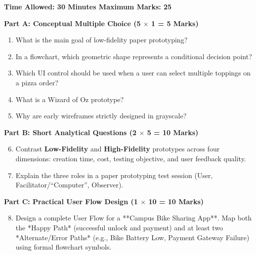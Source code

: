 \begin{chaptertest}
\textbf{Time Allowed: 30 Minutes \hfill Maximum Marks: 25}

\vspace{0.4cm}
\noindent\textbf{Part A: Conceptual Multiple Choice (5 $\times$ 1 = 5 Marks)}
\begin{enumerate}[leftmargin=1.2em, itemsep=2pt]
    \item What is the main goal of low-fidelity paper prototyping?
    \item In a flowchart, which geometric shape represents a conditional decision point?
    \item Which UI control should be used when a user can select multiple toppings on a pizza order?
    \item What is a Wizard of Oz prototype?
    \item Why are early wireframes strictly designed in grayscale?
\end{enumerate}

\vspace{0.3cm}
\noindent\textbf{Part B: Short Analytical Questions (2 $\times$ 5 = 10 Marks)}
\begin{enumerate}[leftmargin=1.2em, itemsep=4pt]
    \setcounter{enumi}{5}
    \item Contrast \textbf{Low-Fidelity} and \textbf{High-Fidelity} prototypes across four dimensions: creation time, cost, testing objective, and user feedback quality.
    \item Explain the three roles in a paper prototyping test session (User, Facilitator/``Computer'', Observer).
\end{enumerate}

\vspace{0.3cm}
\noindent\textbf{Part C: Practical User Flow Design (1 $\times$ 10 = 10 Marks)}
\begin{enumerate}[leftmargin=1.2em, itemsep=4pt]
    \setcounter{enumi}{7}
    \item Design a complete User Flow for a **Campus Bike Sharing App**. Map both the *Happy Path* (successful unlock and payment) and at least two *Alternate/Error Paths* (e.g., Bike Battery Low, Payment Gateway Failure) using formal flowchart symbols.
\end{enumerate}
\end{chaptertest}

